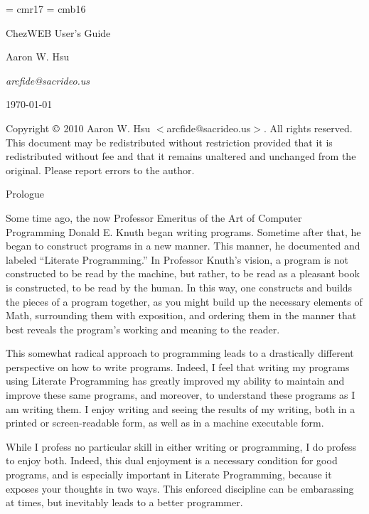 
 
\font\titlefont = cmr17
\font\chapfont = cmb16

\def\prologue{%
  \singlecolumn
  \centerline{\chapfont Prologue}
  \doublecolumns}
\def\endprologue{\par\vfil\break}
 
\null\vskip 3in
\centerline{\titlefont ChezWEB User's Guide}\bigskip
\centerline{Aaron W. Hsu}\smallskip
\centerline{\it arcfide@sacrideo.us}\medskip
\centerline{\today}
\vfill\noindent
Copyright $\copyright$ 2010 Aaron W. Hsu $<$arcfide@sacrideo.us$>$. All
rights reserved.\medskip\noindent
This document may be redistributed without restriction provided that
it is redistributed without fee and that it remains unaltered and
unchanged from the original. Please report errors to the author.\par
\vfil\break

\doublecolumns

\prologue

Some time ago, the now Professor Emeritus of the Art of Computer
Programming Donald E. Knuth began writing programs. Sometime after
that, he began to construct programs in a new manner. This manner, he
documented and labeled ``Literate Programming.'' In Professor Knuth's
vision, a program is not constructed to be read by the machine, but
rather, to be read as a pleasant book is constructed, to be read by
the human. In this way, one constructs and builds the pieces of a
program together, as you might build up the necessary elements of
Math, surrounding them with exposition, and ordering them in the
manner that best reveals the program's working and meaning to the
reader. 
 
This somewhat radical approach to programming leads to a drastically
different perspective on how to write programs. Indeed, I feel that
writing my programs using Literate Programming has greatly improved my
ability to maintain and improve these same programs, and moreover, to
understand these programs as I am writing them. I enjoy writing and
seeing the results of my writing, both in a printed or screen-readable
form, as well as in a machine executable form. 
 
While I profess no particular skill in either writing or programming,
I do profess to enjoy both. Indeed, this dual enjoyment is a necessary
condition for good programs, and is especially important in Literate
Programming, because it exposes your thoughts in two ways. This
enforced discipline can be embarassing at times, but inevitably leads
to a better programmer. 
 

\endprologue
 
\bye
